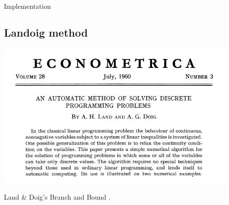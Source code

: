 \vfill

\begin{bclogo}[logo=\bcinfo, barre=none ]{\small Implementation}
\vspace{0.2cm}

\end{bclogo}
\vfill




\newpage



\subsection*{Landoig method}


\begin{center}
\centering
\includegraphics[width=12cm]{fig/econometrica.png}

Land \& Doig's Branch and Bound \cite{land60automatic}. 
\end{center}{}

